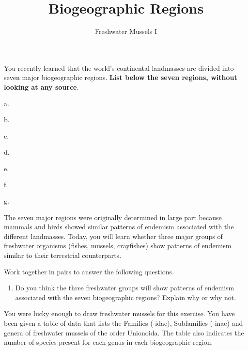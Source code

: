 \documentclass[11pt]{article}
\title{Biogeographic Regions}
\author{Freshwater Mussels I}
\date{}                                           %
\begin{document}
\maketitle
\thispagestyle{empty}


You recently learned that the world's continental landmasses are divided
into seven major biogeographic regions. \textbf{List below the seven
regions, without looking at any source}.

\begin{multicols}{2}
a.\vspace{0.5\baselineskip}

b.\vspace{0.5\baselineskip}

c.\vspace{0.5\baselineskip}

d.\vspace{0.5\baselineskip}

\columnbreak

e.\vspace{0.5\baselineskip}

f.\vspace{0.5\baselineskip}

g.\vspace{0.5\baselineskip}

\end{multicols}

The seven major regions were originally determined in large part because
mammals and birds showed similar patterns of endemism associated with
the different landmasses. Today, you will learn whether three major
groups of freshwater organisms (fishes, mussels, crayfishes) show
patterns of endemism similar to their terrestrial counterparts.

Work together in pairs to answer the following questions.

\begin{enumerate}[leftmargin=*]
\item Do you think the three freshwater groups will show patterns of
endemism associated with the seven biogeographic regions? Explain why or
why not.\vspace{10\baselineskip}

\end{enumerate}

You were lucky enough to draw freshwater mussels for this exercise. You
have been given a table of data that lists the Families (-idae),
Subfamilies (-inae) and genera of freshwater mussels of the order
Unionoida. The table also indicates the number of species present for
each genus in each biogeographic region.
\end{document}
